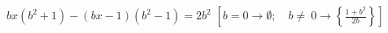 \begin{esercizio}[\Ast]
\begin{enumeratea}
 \item $bx\left(b^{2}+1\right)-(bx-1)\left(b^{2}-1\right)=2b^{2}$
\hfill $\left[b=0 \rightarrow \emptyset; \quad 
b\neq~0 \rightarrow \left\{\frac{1+b^{2}}{2b}\right\}\right]$
\end{enumeratea}
\end{esercizio}

